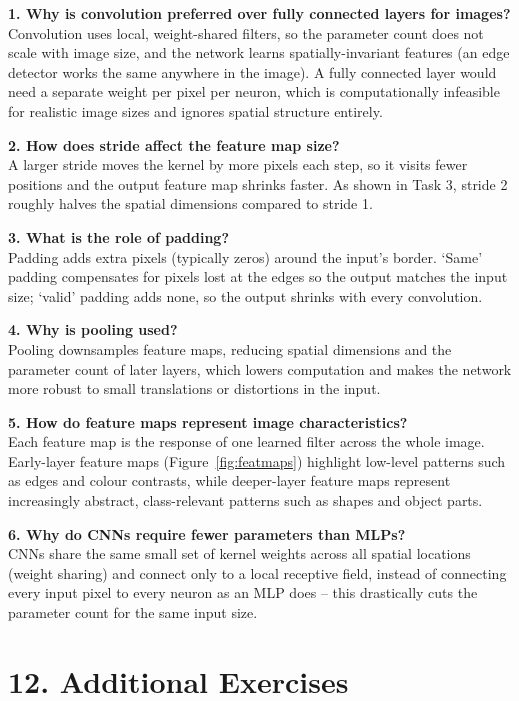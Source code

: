 \documentclass[11pt]{article}
\begin{document}
\textbf{1. Why is convolution preferred over fully connected layers for images?} \\
Convolution uses local, weight-shared filters, so the parameter count does not scale with image size, and the network learns spatially-invariant features (an edge detector works the same anywhere in the image). A fully connected layer would need a separate weight per pixel per neuron, which is computationally infeasible for realistic image sizes and ignores spatial structure entirely.

\textbf{2. How does stride affect the feature map size?} \\
A larger stride moves the kernel by more pixels each step, so it visits fewer positions and the output feature map shrinks faster. As shown in Task 3, stride 2 roughly halves the spatial dimensions compared to stride 1.

\textbf{3. What is the role of padding?} \\
Padding adds extra pixels (typically zeros) around the input's border. `Same' padding compensates for pixels lost at the edges so the output matches the input size; `valid' padding adds none, so the output shrinks with every convolution.

\textbf{4. Why is pooling used?} \\
Pooling downsamples feature maps, reducing spatial dimensions and the parameter count of later layers, which lowers computation and makes the network more robust to small translations or distortions in the input.

\textbf{5. How do feature maps represent image characteristics?} \\
Each feature map is the response of one learned filter across the whole image. Early-layer feature maps (Figure~\ref{fig:featmaps}) highlight low-level patterns such as edges and colour contrasts, while deeper-layer feature maps represent increasingly abstract, class-relevant patterns such as shapes and object parts.

\textbf{6. Why do CNNs require fewer parameters than MLPs?} \\
CNNs share the same small set of kernel weights across all spatial locations (weight sharing) and connect only to a local receptive field, instead of connecting every input pixel to every neuron as an MLP does -- this drastically cuts the parameter count for the same input size.

\section*{12. Additional Exercises}
\end{document}

